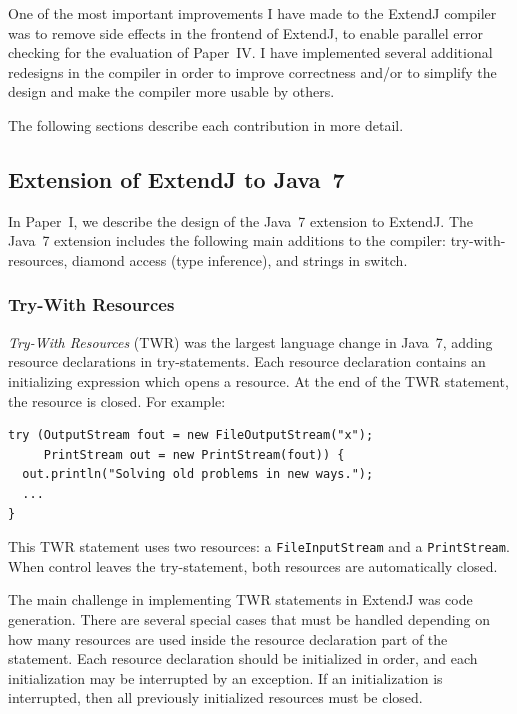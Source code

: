 \documentclass[10pt, twoside, openright]{book}
\begin{document}
\begin{itemize}
    One of the most important improvements I have made to the ExtendJ compiler was
    to remove side effects in the frontend of ExtendJ, to enable parallel error
    checking for the evaluation of
    Paper~IV.
    I have implemented several additional redesigns in the compiler in order to improve
    correctness and/or to simplify the design and make the compiler more usable by others.

\end{itemize}

The following sections describe each contribution in more detail.

\newpage
\subsection{Extension of ExtendJ to Java~7}

In Paper~I, we describe the design of the Java~7 extension to ExtendJ.
The Java~7 extension includes the following main additions to the compiler:
try-with-resources, diamond access (type inference), and strings in switch.

\subsubsection{Try-With Resources}

\emph{Try-With Resources} (TWR) was the largest language change in Java~7, adding resource declarations in try-statements.
Each resource declaration contains an initializing expression which opens a resource.
At the end of the TWR statement, the resource is closed. For example:

\begin{lstlisting}
try (OutputStream fout = new FileOutputStream("x");
     PrintStream out = new PrintStream(fout)) {
  out.println("Solving old problems in new ways.");
  ...
}
\end{lstlisting}

\noindent
This TWR statement uses two resources: a \texttt{FileInputStream} and a \texttt{PrintStream}.
When control leaves the try-statement, both resources are automatically closed.

The main challenge in implementing TWR statements in ExtendJ was code generation. There are several
special cases that must be handled depending on how many resources are used inside the resource
declaration part of the statement. Each resource declaration should be initialized in order, and
each initialization may be interrupted by an exception. If an initialization is interrupted, then
all previously initialized resources must be closed.
\end{document}
